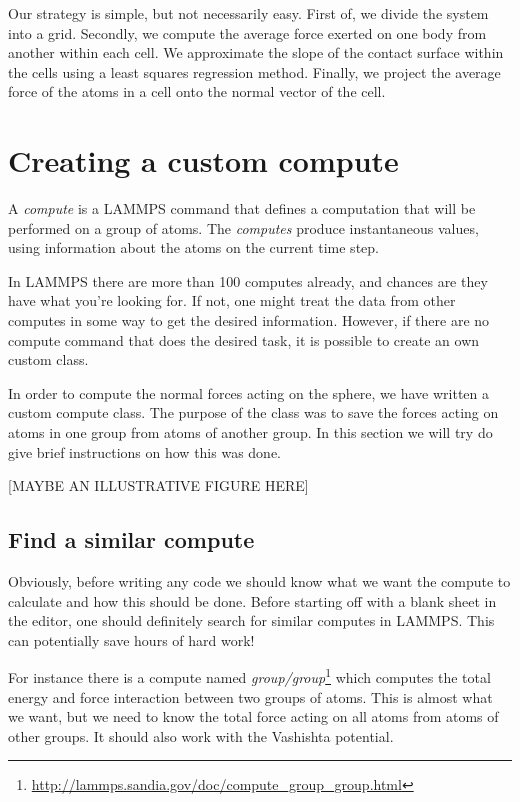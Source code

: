 \documentclass[twoside,english]{uiofysmaster}
\begin{document}
Our strategy is simple, but not necessarily easy. 
First of, we divide the system into a grid. 
Secondly,  we compute the average force exerted on one body from another within each cell. 
We approximate the slope of the contact surface within the cells using a least squares regression method. 
Finally, we project the average force of the atoms in a cell onto the normal vector of the cell.


\section{Creating a custom compute}
A \textit{compute} is a LAMMPS command that defines a computation that will be performed on a group of atoms. The \textit{computes} produce instantaneous values, using information about the atoms on the current time step. 

In LAMMPS there are more than 100 computes already, and chances are they have what you're looking for. If not, one might treat the data from other computes in some way to get the desired information. However, if there are no compute command that does the desired task, it is possible to create an own custom class.  

In order to compute the normal forces acting on the sphere, we have written a custom compute class. The purpose of the class was to save the forces acting on atoms in one group from atoms of another group. In this section we will try do give brief instructions on how this was done.

{\color{editColor}[MAYBE AN ILLUSTRATIVE FIGURE HERE]}

\subsection{Find a similar compute}
Obviously, before writing any code we should know what we want the compute to calculate and how this should be done. 
Before starting off with a blank sheet in the editor, one should definitely search for similar computes in LAMMPS. This can potentially save hours of hard work!

For instance there is a compute named \textit{group/group}\footnote{\href{http://lammps.sandia.gov/doc/compute_group_group.html}{http://lammps.sandia.gov/doc/compute\_group\_group.html}} which computes the total energy and force interaction between two groups of atoms. 
This is almost what we want, but we need to know the total force acting on all atoms from atoms of other groups. {\color{editColor}It should also work with the Vashishta potential.}
\end{document}
